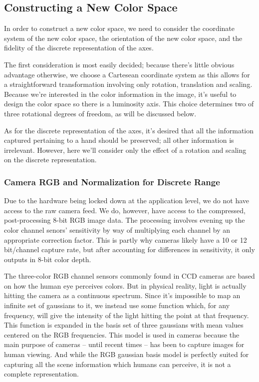 \documentclass[10pt,a4paper]{article}
\begin{document}
\subsection{Constructing a New Color Space}\label{sec:ConstructingANewColorSpace}

In order to construct a new color space, we need to consider the coordinate system of the new color space, the orientation of the new color space, and the fidelity of the discrete representation of the axes.

The first consideration is most easily decided; because there's little obvious advantage otherwise, we choose a Cartesean coordinate system as this allows for a straightforward transformation involving only rotation, translation and scaling. Because we're interested in the color information in the image, it's useful to design the color space so there is a luminosity axis. This choice determines two of three rotational degrees of freedom, as will be discussed below.

As for the discrete representation of the axes, it's desired that all the information captured pertaining to a hand should be preserved; all other information is irrelevant. However, here we'll consider only the effect of a rotation and scaling on the discrete representation.


\subsubsection{Camera RGB and Normalization for Discrete Range}\label{sec:CameraRGB}



Due to the hardware being locked down at the application level, we do not have access to the raw camera feed. We do, however, have access to the compressed, post-processing 8-bit RGB image data. The processing involves evening up the color channel senors' sensitivity by way of multiplying each channel by an appropriate correction factor. This is partly why cameras likely have a 10 or 12 bit/channel capture rate, but after accounting for differences in sensitivity, it only outputs in 8-bit color depth.

The three-color RGB channel sensors commonly found in CCD cameras are based on how the human eye perceives colors. But in physical reality, light is actually hitting the camera as a continuous spectrum. Since it's impossible to map an infinite set of gaussians to it, we instead use some function which, for any frequency, will give the intensity of the light hitting the point at that frequency. This function is expanded in the basis set of three gaussians with mean values centered on the RGB frequencies. This model is used in cameras because the main purpose of cameras -- until recent times -- has been to capture images for human viewing. And while the RGB gaussian basis model is perfectly suited for capturing all the scene information which humans can perceive, it is not a complete representation.
\end{document}

